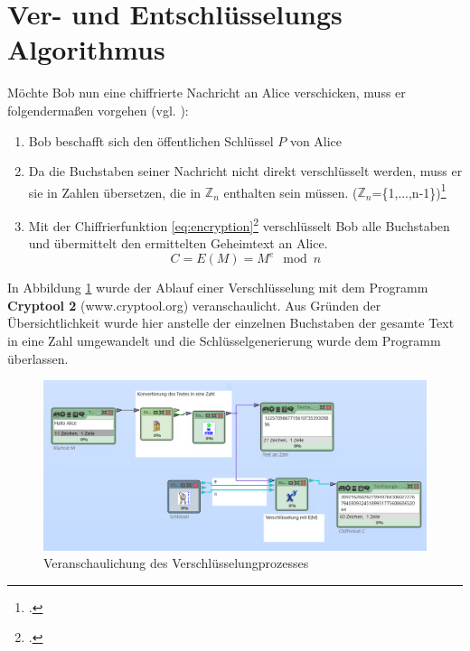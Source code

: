 \documentclass{scrarticle}
\begin{document}
    \section{Ver- und Entschlüsselungs Algorithmus}
            Möchte Bob nun eine chiffrierte Nachricht an Alice verschicken, muss er folgendermaßen vorgehen (vgl. \cite[71]{watjen2008}):
            \begin{enumerate}
                \item Bob beschafft sich den öffentlichen Schlüssel $P$ von Alice
                \item Da die Buchstaben seiner Nachricht nicht direkt verschlüsselt werden, muss er sie in Zahlen übersetzen, die in $\mathbb{Z}_n$ enthalten sein müssen. ($\mathbb{Z}_n$=\{1,...,n-1\})\footcite[161]{ertel2003}
                \item
                Mit der Chiffrierfunktion \ref{eq:encryption}\footcite[77]{ertel2003} verschlüsselt Bob alle Buchstaben und übermittelt den ermittelten Geheimtext an Alice.
                \begin{equation}
                    C = E(M) = M^{e}\mod{n} \label{eq:encryption}
                \end{equation}
            \end{enumerate}
            In Abbildung \ref{fig:encrypt} wurde der Ablauf einer Verschlüsselung mit dem Programm \textbf{Cryptool 2} (www.cryptool.org) veranschaulicht. Aus Gründen der Übersichtlichkeit wurde hier anstelle der einzelnen Buchstaben der gesamte Text in eine Zahl umgewandelt und die Schlüsselgenerierung wurde dem Programm überlassen.
            \begin{figure}
                \includegraphics[width=\linewidth]{content/cryptool_encrypt_e1.png}
                \caption{Veranschaulichung des Verschlüsselungprozesses\protect\footnotemark}
                \label{fig:encrypt}
            \end{figure}
\end{document}
